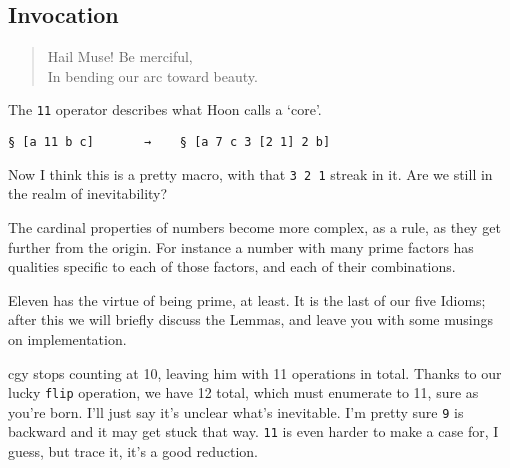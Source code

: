 \documentclass[twoside]{article}
\begin{document}
\subsection{Invocation}

\begin{quote}
Hail Muse! Be merciful, \\
In bending our arc toward beauty.
\end{quote}

The \texttt{11} operator describes what Hoon calls a `core'.

\begin{lstlisting}[style=listingcode]
§ [a 11 b c]       →    § [a 7 c 3 [2 1] 2 b]
\end{lstlisting}

\noindent
Now I think this is a pretty macro, with that \texttt{3 2 1} streak in it.  Are we still in the realm of inevitability?

The cardinal properties of numbers become more complex, as a rule, as they get further from the origin. For instance a number with many prime factors has qualities specific to each of those factors, and each of their combinations. %

Eleven has the virtue of being prime, at least. It is the last of our five Idioms; after this we will briefly discuss the Lemmas, and leave you with some musings on implementation.

cgy stops counting at 10, leaving him with 11 operations in total. Thanks to our lucky \texttt{flip} operation, we have 12 total, which must enumerate to 11, sure as you're born.
%
I'll just say it's unclear what's inevitable. I'm pretty sure \texttt{9} is backward and it may get stuck that way. \texttt{11} is even harder to make a case for, I guess, but trace it, it's a good reduction.
\end{document}
